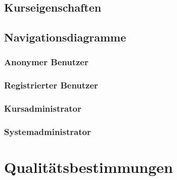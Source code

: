 \documentclass[a4paper]{scrreprt}
\begin{document}
   
       
    
    \section{Kurseigenschaften}
    
    
       
    
    
    \section{Navigationsdiagramme}
        \subsection{Anonymer Benutzer}
            
            
            
        \subsection{Registrierter Benutzer}
             
            
            
        \subsection{Kursadministrator}
            
             
            
        \subsection{Systemadministrator}
           
            
            
            
         
\chapter{Qualitätsbestimmungen}
\end{document}
